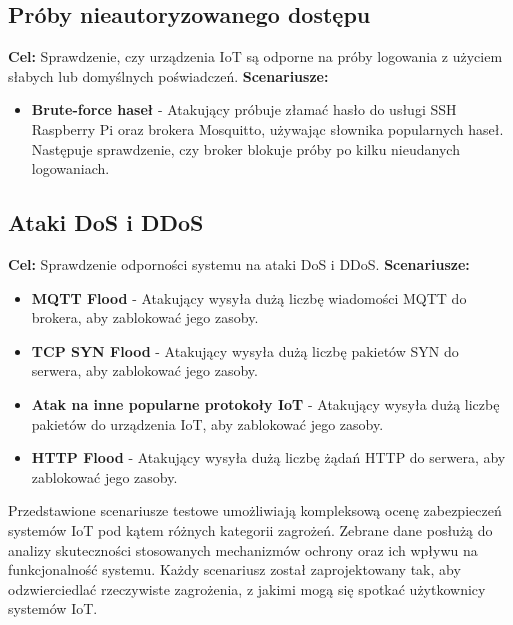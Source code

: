 \subsection{Próby nieautoryzowanego dostępu}
\textbf{Cel: } Sprawdzenie, czy urządzenia IoT są odporne na próby logowania z użyciem słabych lub domyślnych poświadczeń.
\textbf{Scenariusze:}
\begin{itemize}
    \item \textbf{Brute-force haseł} - Atakujący próbuje złamać hasło do usługi SSH Raspberry Pi oraz brokera Mosquitto, używając słownika popularnych haseł. Następuje sprawdzenie, czy broker blokuje próby po kilku nieudanych logowaniach.
\end{itemize}
\subsection{Ataki DoS i DDoS}
\textbf{Cel: } Sprawdzenie odporności systemu na ataki DoS i DDoS.
\textbf{Scenariusze:}
\begin{itemize}
    \item \textbf{MQTT Flood} - Atakujący wysyła dużą liczbę wiadomości MQTT do brokera, aby zablokować jego zasoby.
    \item \textbf{TCP SYN Flood} - Atakujący wysyła dużą liczbę pakietów SYN do serwera, aby zablokować jego zasoby.
    \item \textbf{Atak na inne popularne protokoły IoT} - Atakujący wysyła dużą liczbę pakietów do urządzenia IoT, aby zablokować jego zasoby.
    \item \textbf{HTTP Flood} - Atakujący wysyła dużą liczbę żądań HTTP do serwera, aby zablokować jego zasoby.
\end{itemize}

Przedstawione scenariusze testowe umożliwiają kompleksową ocenę zabezpieczeń systemów IoT pod kątem różnych kategorii zagrożeń. Zebrane dane posłużą do analizy skuteczności stosowanych mechanizmów ochrony oraz ich wpływu na funkcjonalność systemu. Każdy scenariusz został zaprojektowany tak, aby odzwierciedlać rzeczywiste zagrożenia, z jakimi mogą się spotkać użytkownicy systemów IoT.